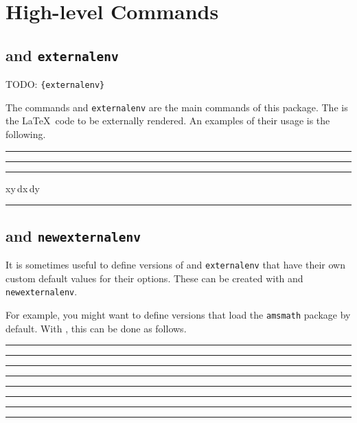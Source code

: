 \documentclass[10pt]{ltxdoc}
\newcommand{\env}[1]{\texttt{#1}}
\newcommand{\pkg}[1]{\texttt{#1}}
\def\gauge{%
  \rule{0.2em}{7pt}%
  \llap{\rule[8pt]{0.2em}{2pt}}%
}
\begin{document}
\section{High-level Commands}
\label{sec:High-level Commands}

\subsection{ and \env{externalenv}}
\label{subsec:external and externalenv}


TODO: \texttt{\{externalenv\}}

The commands  and \env{externalenv} are the main commands
of this package.
The  is the \LaTeX\ code to be externally rendered.
An examples of their usage is the following.

\begin{tcblisting}{}
\gauge
{}%
\gauge

\gauge
\begin{externalenv}[preamble={\usepackage{amsmath}},math=inline]
\iint xy\,dx\,dy%
\end{externalenv}
\gauge
\end{tcblisting}

\subsection{ and \env{newexternalenv}}
\label{subsec:newexternal and newexternalenv}



It is sometimes useful to define versions of  and
\env{externalenv} that have their own custom default values for their
options.
These can be created with  and \env{newexternalenv}.

For example, you might want to define versions that load the
\pkg{amsmath} package by default.
With , this can be done as follows.

\begin{tcblisting}{}
\gauge\newexternal[preamble={\usepackage{amsmath}}, math=inline]
  {\ams}\gauge

\gauge{}\gauge

\gauge{}\gauge

\gauge{}\gauge
\end{tcblisting}
\end{document}
